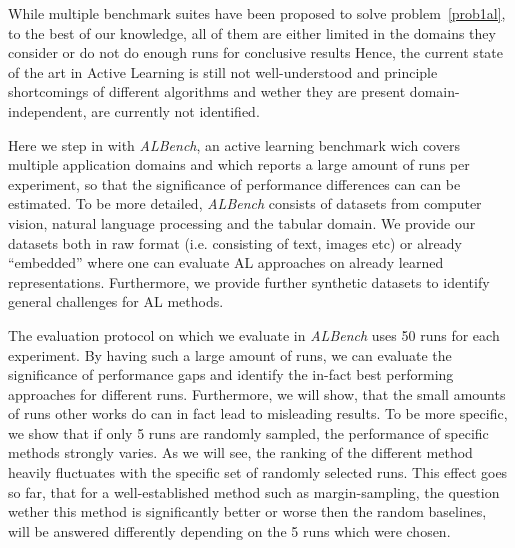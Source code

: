 \documentclass[]{article}
\begin{document}
While multiple benchmark suites have been proposed to solve
problem~\ref{prob1al}, to the best of
our knowledge, all of them are either limited in the domains they consider or do
not do enough runs for conclusive results 
Hence, the current
state of the art in Active Learning is still not well-understood and principle
shortcomings of different algorithms and wether they are present
domain-independent, are currently not identified.

Here we step in with \emph{ALBench}, an active learning benchmark wich covers
multiple application domains and which reports a large amount of runs per
experiment, so that the significance of performance differences can can be
estimated. To be more detailed, \emph{ALBench} consists of datasets from
computer vision, natural language processing and the tabular domain. We provide
our datasets both in raw format (i.e. consisting of text, images etc) or already
``embedded'' where one can evaluate AL approaches on already learned representations.
Furthermore, we provide further synthetic datasets to identify general
challenges for AL methods.

The evaluation protocol on which we evaluate in \emph{ALBench} uses 50 runs for
each experiment. By having such a large amount of runs, we can evaluate the
significance of performance gaps and identify the in-fact best performing
approaches for different runs. Furthermore, we will show, that the small amounts
of runs other works do can in fact lead to misleading results. To be more
specific, we show that if only 5 runs are randomly sampled, the performance of
specific methods strongly varies. As we will see, the ranking of
the different method heavily fluctuates with the specific set of randomly
selected runs. This effect goes so far, that for a well-established method such
as margin-sampling, the question wether this method is significantly better or
worse then the random baselines, will be answered differently depending on the 5
runs which were chosen. 
\end{document}
